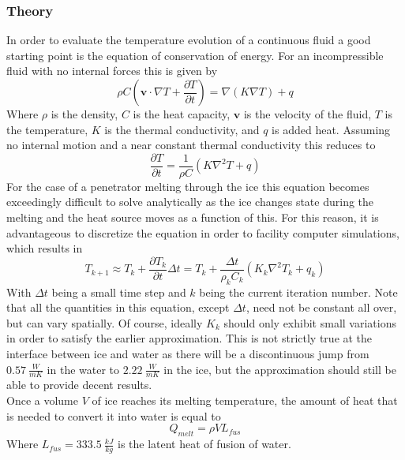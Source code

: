 \subsubsection{Theory}
In order to evaluate the temperature evolution of a continuous fluid a good starting point is the equation of conservation of energy. For an incompressible fluid with no internal forces this is given by
\begin{equation}
\rho C \left( \mathbf{v} \cdot \nabla T + \frac{\partial T}{\partial t} \right) = \nabla (K \nabla T) + q 
\end{equation} 
Where $\rho$ is the density, $C$ is the heat capacity, $\mathbf{v}$ is the velocity of the fluid, $T$ is the temperature, $K$ is the thermal conductivity, and $q$ is added heat\cite{article:barr2014a}. Assuming no internal motion and a near constant thermal conductivity this reduces to
\begin{equation}
\label{eq:thermal1}
\frac{\partial T}{\partial t} = \frac{1}{\rho C}\left( K \nabla^2 T + q \right)
\end{equation}
For the case of a penetrator melting through the ice this equation becomes exceedingly difficult to solve analytically as the ice changes state during the melting and the heat source moves as a function of this. For this reason, it is advantageous to discretize the equation in order to facility computer simulations, which results in\\
\begin{equation} \label{eq:thermal2}
T_{k+1} \approx T_{k} + \frac{\partial T_{k}}{\partial t}\Delta t = T_{k} + \frac{\Delta t}{\rho_k C_k}\left( K_k \nabla^2 T_{k} + q_{k} \right)
\end{equation}
With $\Delta t$ being a small time step and $k$ being the current iteration number. Note that all the quantities in this equation, except $\Delta t$, need not be constant all over, but can vary spatially. Of course, ideally $K_k$ should only exhibit small variations in order to satisfy the earlier approximation. This is not strictly true at the interface between ice and water as there will be a discontinuous jump from $\SI{0.57}{\frac{W}{m K}}$ in the water to $\SI{2.22}{\frac{W}{m K}}$\cite{website:engineeringToolbox} in the ice, but the approximation should still be able to provide decent results.\\

\noindent
Once a volume $V$ of ice reaches its melting temperature, the amount of heat that is needed to convert it into water is equal to
\begin{equation}
Q_{melt} = \rho V L_{fus}
\end{equation}
Where $L_{fus} = \SI{333.5}{\frac{kJ}{kg}}$ is the latent heat of fusion of water\cite{article:biele2011a}.

